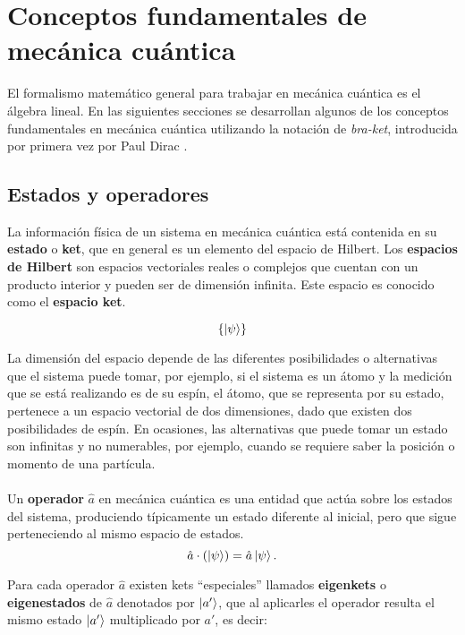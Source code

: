 \chapter{Conceptos fundamentales de mecánica cuántica}\label{ch:2}

\noindent El formalismo matemático general para trabajar en  mecánica cuántica es el álgebra lineal. En las siguientes secciones se desarrollan algunos de los conceptos fundamentales en mecánica cuántica utilizando la notación de \emph{bra-ket}, introducida por primera vez por Paul Dirac \cite{Dirac_1939}.

\section{Estados y operadores}\label{sec:Estados y Operadores}
\noindent La información física de un sistema en mecánica cuántica está contenida en su \textbf{estado} o \textbf{ket}, que en general es un elemento del espacio de Hilbert. Los \textbf{espacios de Hilbert} son espacios vectoriales reales o complejos que cuentan con un producto interior y pueden ser de dimensión infinita. Este espacio es conocido como el \textbf{espacio ket}.

\[
\{\ket{\psi}\}
\]

La dimensión del espacio depende de las diferentes posibilidades o alternativas que el sistema puede tomar, por ejemplo, si el sistema es un átomo y la medición que se está realizando es de su espín, el átomo, que se representa por su estado, pertenece a un espacio vectorial de dos dimensiones, dado que existen dos posibilidades de espín. En ocasiones, las alternativas que puede tomar un estado son infinitas y no numerables, por ejemplo, cuando se requiere saber la posición o momento de una partícula.
\\
\\
Un \textbf{operador} $\hat{a}$ en mecánica cuántica es una entidad que actúa sobre los estados del sistema, produciendo típicamente un estado diferente al inicial, pero que sigue perteneciendo al mismo espacio de estados.
\[
\hat{a} \cdot (\ket{\psi}) = \hat{a}\ket{\psi}.
\]

Para cada operador $\hat{a}$ existen kets ``especiales'' llamados \textbf{eigenkets} o \textbf{eigenestados} de $\hat{a}$ denotados por $\ket{a'}$, que al aplicarles el operador resulta el mismo estado $\ket{a'}$ multiplicado por $a'$, es decir:


